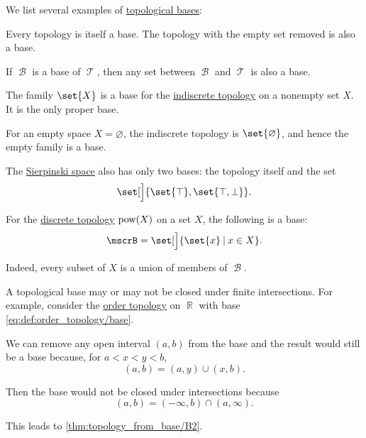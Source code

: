 \begin{example}\label{ex:def:topological_base}
  We list several examples of \hyperref[def:topological_base]{topological bases}:
  \begin{thmenum}
     Every topology is itself a base. The topology with the empty set removed is also a base.

     If \( \mscrB \) is a base of \( \mscrT \), then any set between \( \mscrB \) and \( \mscrT \) is also a base.

     The family \( \set{ X } \) is a base for the \hyperref[def:indiscrete_topology]{indiscrete topology} on a nonempty set \( X \). It is the only proper base.

    For an empty space \( X = \varnothing \), the indiscrete topology is \( \set{ \varnothing } \), and hence the empty family is a base.

     The \hyperref[def:sierpinski_space]{Sierpinski space} also has only two bases: the topology itself and the set
    \begin{equation*}
      \set[\Big]{ \set{ \top }, \set{ \top, \bot } }.
    \end{equation*}

     For the \hyperref[def:discrete_topology]{discrete topology} \( \operatorname{pow}(X) \) on a set \( X \), the following is a base:
    \begin{equation*}
      \mscrB = \set[\Big]{ \set{ x } \given x \in X }.
    \end{equation*}

    Indeed, every subset of \( X \) is a union of members of \( \mscrB \).

     A topological base may or may not be closed under finite intersections. For example, consider the \hyperref[def:order_topology]{order topology} on \( \BbbR \) with base \eqref{eq:def:order_topology/base}.

    We can remove any open interval \( (a, b) \) from the base and the result would still be a base because, for \( a < x < y < b \),
    \begin{equation*}
      (a, b) = (a, y) \cup (x, b).
    \end{equation*}

    Then the base would not be closed under intersections because
    \begin{equation*}
      (a, b) = (-\infty, b) \cap (a, \infty).
    \end{equation*}

    This leads to \ref{thm:topology_from_base/B2}.
  \end{thmenum}
\end{example}

